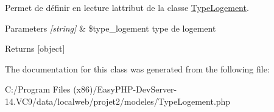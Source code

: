 Permet de définir en lecture l\textquotesingle{}attribut de la classe \hyperlink{class_type_logement}{Type\+Logement}. 


\begin{DoxyParams}{Parameters}
{\em \mbox{[}string\mbox{]}} & \$type\+\_\+logement type de logement \\
\hline
\end{DoxyParams}
\begin{DoxyReturn}{Returns}
\mbox{[}object\mbox{]} 
\end{DoxyReturn}


The documentation for this class was generated from the following file\+:\begin{DoxyCompactItemize}
\item 
C\+:/\+Program Files (x86)/\+Easy\+P\+H\+P-\/\+Dev\+Server-\/14.\+V\+C9/data/localweb/projet2/modeles/Type\+Logement.\+php\end{DoxyCompactItemize}
